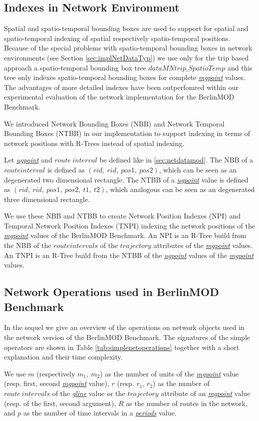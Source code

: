 \documentclass[a4paper]{article}
\newcommand{\bmodb} {BerlinMOD Benchmark}
\newcommand{\dt}[1]{\textsl{\underline{#1}}}
\begin{document}
\subsection{Indexes in Network Environment}
\label{sec:implNetIndex}
Spatial and spatio-temporal bounding boxes are used to support for spatial
and spatio-temporal indexing of spatial respectively spatio-temporal positions.
Because of the special problems with spatio-temporal bounding boxes in network
environments (see Section \ref{sec:implNetDataTyp}) we use only for the trip
based approach a spatio-temporal bounding box tree $dataMNtrip\_SpatioTemp$ and
this tree only indexes spatio-temporal bounding boxes for complete \dt{mgpoint}
values. The advantages of more detailed indexes have been outperfomred within
our experimental evaluation of the network implementation for the \bmodb{}.

We introduced Network Bounding Boxes (NBB) and Network Temporal Bounding Boxes
(NTBB) in our implementation to support indexing in terms of network positions
with R-Trees instead of spatial indexing.

Let \dt{ugpoint} and $route\ interval$ be defined like in \ref{sec:netdatamod}.
The NBB of a $route interval$ is defined as $(rid,\ rid,\ pos1,\ pos2)$,
which can be seen as an degenerated two dimensional rectangle.
The NTBB of a \dt{ugpoint} value is defined as $(rid,\ rid,\ pos1,\ pos2,\ t1,\ t2)$,
which analogous can be seen as an degenerated three dimensional rectangle.

We use these NBB and NTBB to create Network Position Indexes (NPI) and
Temporal Network Position Indexes (TNPI) indexing the network positions of
the \dt{mgpoint} values of the \bmodb{}. An NPI is an R-Tree build from the NBB
of the $route intervals$ of the $trajectory$ attributes of the \dt{mgpoint} values.
An TNPI is an R-Tree build from the NTBB of the \dt{ugpoint} values of the
\dt{mgpoint} values.
\subsection{Network Operations used in \bmodb{}}
\label{sec:implNetOperations}
In the sequel we give an overview of the operations on network objects used in
the network version of the \bmodb{}. The signatures of the simple operators are
shown in Table \ref{tab:simplenetoperations} together with a short explanation and
their time complexity.

We use $m$ (respectively $m_1,\ m_2$) as the number of units of the \dt{mgpoint} value
(resp. first, second \dt{mgpoint} value),
$r$ (resp. $r_1$, $r_2$) as the number of $route\ intervals$ of the \dt{gline} value
or the $trajectory$ attribute of an \dt{mgpoint} value (resp. of the first, second
argument), $R$ as the number of routes in the network, and $p$ as the number of
time intervals in a \dt{periods} value.
\end{document}
